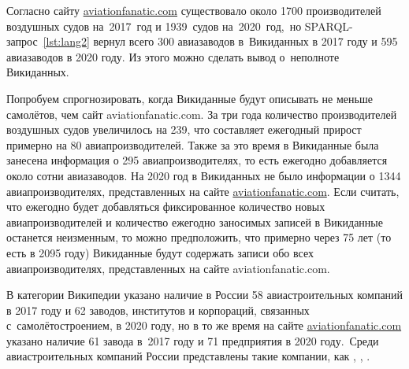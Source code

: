 Согласно сайту \href{https://www.aviationfanatic.com/}{aviationfanatic.com} 
существовало около \num{1700} производителей воздушных судов 
на~2017~год и 1939~судов на~2020~год,\, %
но SPARQL-запрос~\ref{lst:lang2} вернул всего 300 авиазаводов в~Вики\-дан\-ных в 2017 году 
и 595 авиазаводов в 2020 году. Из этого можно сделать вывод о~неполноте Викиданных.  

Попробуем спрогнозировать, когда Викиданные будут описывать не меньше самолётов, 
чем сайт aviationfanatic.com. 
За три года количество производителей воздушных судов увеличилось на 239, 
что составляет ежегодный прирост примерно на 80 авиапроизводителей. 
Также за это время в Викиданные была занесена информация о 295 авиапроизводителях, 
то есть ежегодно добавляется около сотни авиазаводов. 
На 2020 год в Викиданных не было информации о \num{1344} авиапроизводителях, 
представленных на сайте \href{https://www.aviationfanatic.com/}{aviationfanatic.com}. 
Если считать, что ежегодно будет добавляться фиксированное количество новых авиапроизводителей 
и количество ежегодно заносимых записей в Викиданные останется неизменным, 
то можно предположить, что примерно через 75 лет (то есть в 2095 году) 
Викиданные будут содержать записи обо всех авиапроизводителях, представленных на сайте aviationfanatic.com.

В категории Википедии  указано наличие в России 58 авиастроительных компаний в 2017 году 
и 62 заводов, институтов и корпораций, связанных с~самолётостроением, в 2020 году, 
но в то же время на сайте \href{https://www.aviationfanatic.com/}{aviationfanatic.com} 
указано наличие 61 завода в~2017 году 
и 71 предприятия в 2020 году.\, %
Среди авиастроительных компаний России 
представлены такие компании, как , , .

